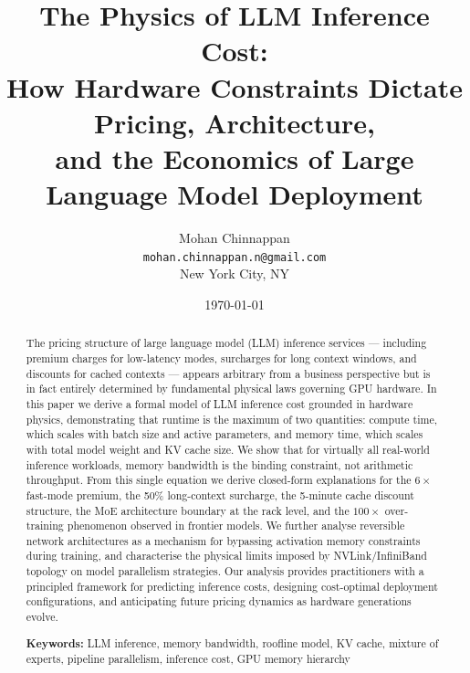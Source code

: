 \documentclass[11pt,a4paper]{article}
\begin{document}
\title{%
  \textbf{The Physics of LLM Inference Cost:}\\
  \large How Hardware Constraints Dictate Pricing, Architecture,\\
  and the Economics of Large Language Model Deployment
}

\author{%
  Mohan Chinnappan\\
  \texttt{mohan.chinnappan.n@gmail.com}\\[6pt]
  \small New York City, NY
}

\date{\today}

\maketitle

\begin{abstract}
The pricing structure of large language model (LLM) inference services —
including premium charges for low-latency modes, surcharges for long context
windows, and discounts for cached contexts — appears arbitrary from a business
perspective but is in fact entirely determined by fundamental physical laws
governing GPU hardware. In this paper we derive a formal model of LLM inference
cost grounded in hardware physics, demonstrating that runtime is the maximum of
two quantities: compute time, which scales with batch size and active parameters,
and memory time, which scales with total model weight and KV cache size. We show
that for virtually all real-world inference workloads, memory bandwidth is the
binding constraint, not arithmetic throughput. From this single equation we derive
closed-form explanations for the $6\times$ fast-mode premium, the 50\% long-context
surcharge, the 5-minute cache discount structure, the MoE architecture boundary at
the rack level, and the $100\times$ over-training phenomenon observed in frontier
models. We further analyse reversible network architectures as a mechanism for
bypassing activation memory constraints during training, and characterise the physical
limits imposed by NVLink/InfiniBand topology on model parallelism strategies.
Our analysis provides practitioners with a principled framework for predicting
inference costs, designing cost-optimal deployment configurations, and anticipating
future pricing dynamics as hardware generations evolve.

\medskip\noindent
\textbf{Keywords:} LLM inference, memory bandwidth, roofline model, KV cache,
mixture of experts, pipeline parallelism, inference cost, GPU memory hierarchy
\end{abstract}
\end{document}
